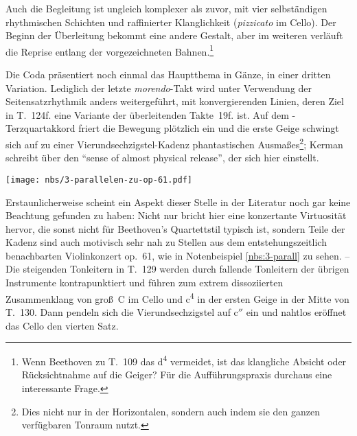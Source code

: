 Auch die Begleitung ist ungleich komplexer als zuvor, mit vier
selbständigen rhythmischen Schichten und raffinierter Klanglichkeit
(\textit{pizzicato} im Cello).  Der Beginn der Überleitung bekommt
eine andere Gestalt, aber im weiteren verläuft die Reprise entlang der
vorgezeichneten Bahnen.\footnote{Wenn Beethoven zu T.~109 das
d\textsuperscript{4} vermeidet, ist das klangliche Absicht oder
Rücksichtnahme auf die Geiger? Für die Aufführungspraxis durchaus
eine interessante Frage.}

Die Coda präsentiert noch einmal das Hauptthema in Gänze, in einer
dritten Variation.  Lediglich der letzte \textit{morendo}-Takt wird
unter Verwendung der Seitensatzrhythmik anders weitergeführt, mit
konvergierenden Linien, deren Ziel in T.~124f. eine Variante der
überleitenden Takte~19f. ist.  Auf dem -Terzquartakkord
friert die Bewegung plötzlich ein und die erste Geige schwingt sich
auf zu einer Vierundsechzigstel-Kadenz phantastischen Ausmaßes\footnote{Dies
nicht nur in der Horizontalen, sondern auch indem sie den ganzen
verfügbaren Tonraum nutzt.}; Kerman schreibt über den \foreignquote{english}
{sense of almost physical release}\cite[p.~112]{kerman}, der sich hier
einstellt.

\begin{notenbeispiel}
 \texttt{[image: nbs/3-parallelen-zu-op-61.pdf]}
 \caption{Illustration der motivischen Parallelen zwischen op.~59/1 und op.~61}
 \label{nbs:3-parall}
\end{notenbeispiel}

Erstaunlicherweise scheint ein Aspekt dieser Stelle in der Literatur
noch gar keine Beachtung gefunden zu haben: Nicht nur bricht hier
eine konzertante Virtuosität hervor, die sonst nicht für Beethoven’s
Quartettstil typisch ist, sondern Teile der Kadenz sind auch motivisch
sehr nah zu Stellen aus dem entstehungszeitlich benachbarten
Violinkonzert op.~61, wie in Notenbeispiel \vref{nbs:3-parall} zu
sehen. – Die steigenden Tonleitern in T.~129 werden durch fallende
Tonleitern der übrigen Instrumente kontrapunktiert und führen zum
extrem dissoziierten Zusammenklang von groß~C im Cello und c\textsuperscript{4}
in der ersten Geige in der Mitte von T.~130.  Dann pendeln sich die
Vierundsechzigstel auf c$''$ ein und nahtlos eröffnet das Cello den
vierten Satz.